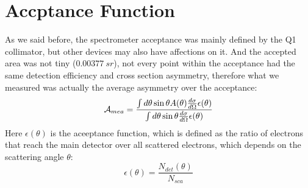 \begin{comment}
\bigskip
One could also estimate the rate from measurement. 
\begin{eqaution}
    \sigma = \sqrt{\frac{1}{R/30}}
\end{eqaution}
\begin{table}[!h]
    \centering
    \begin{tabular}{c c c | c c c c c c}
	\hline
	Target	& run	& I $(\mu A)$   & \thead{rms \\ ($ppm$)} & \thead{rms@$70\ \mu A$ \\ ($ppm$)} & \thead{bcm res. \\ ($ppm$)}   & \thead{bpm res. \\ ($ppm$)}   & \thead{cor. rms \\ ($ppm$)}  & \thead{rate \\ ($GHz$)}  \\
	\hline
	C12	& 4133	& 86.2	& 143	& 158.7	& 20	& 25	& 150.4	& 1.326	\\
	D-Pb-D	& 4112	& 67.7	& 93	& 91.5	& 20	& 25	& 82.9	& 4.365	\\
	\hline
    \end{tabular}
    \caption{The corrected rms was calculated as: $\sqrt{\frac{\sigma^2 - \sigma^2_{bcm} - \sigma^2_{bpm}}{1 + 0.26^2}}$}
\end{table}
The C graphite target has a thickness of $1.991\ mm$ and a density of 
\end{comment}


\section{Accptance Function}
As we said before, the spectrometer acceptance was mainly defined by the Q1 
collimator, but other devices may also have affections on it. And the accepted
area was not tiny ($0.00377 \ sr$), not every point within the acceptance had
the same detection efficiency and cross section asymmetry, therefore what
we measured was actually the average asymmetry over the acceptance:
\begin{equation}
    \mathcal{A}_{mea} = \frac{\int d\theta \sin\theta A(\theta) \frac{d\sigma}{d\Omega} \epsilon(\theta)}{\int d\theta \sin\theta \frac{d\sigma}{d\Omega} \epsilon(\theta)}
    \label{eq:acceptance_function}
\end{equation}
Here $\epsilon(\theta)$ is the aceeptance function, which is defined as
the ratio of electrons that reach the main detector over all scattered
electrons, which depends on the scattering angle $\theta$:
\begin{equation}
    \epsilon(\theta) = \frac{N_{det}(\theta)}{N_{sca}}
    \label{eq:acceptance_definition}
\end{equation}

